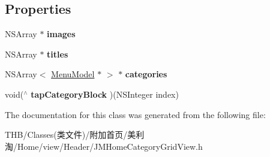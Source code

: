 \subsection*{Properties}
\begin{DoxyCompactItemize}
\item 
\mbox{\label{interface_j_m_home_category_grid_view_a5ecf24f65ebcf2ba1057268ddfbae11c}} 
N\+S\+Array $\ast$ {\bfseries images}
\item 
\mbox{\label{interface_j_m_home_category_grid_view_a6bbc90459957d23e0657859679050ca6}} 
N\+S\+Array $\ast$ {\bfseries titles}
\item 
\mbox{\label{interface_j_m_home_category_grid_view_a41e066e08791bbb966d182304d132a5b}} 
N\+S\+Array$<$ \mbox{\hyperlink{interface_menu_model}{Menu\+Model}} $\ast$ $>$ $\ast$ {\bfseries categories}
\item 
\mbox{\label{interface_j_m_home_category_grid_view_a3602e50e86feb8fd935eb0bd6676813a}} 
void($^\wedge$ {\bfseries tap\+Category\+Block} )(N\+S\+Integer index)
\end{DoxyCompactItemize}


The documentation for this class was generated from the following file\+:\begin{DoxyCompactItemize}
\item 
T\+H\+B/\+Classes(类文件)/附加首页/美利淘/\+Home/view/\+Header/J\+M\+Home\+Category\+Grid\+View.\+h\end{DoxyCompactItemize}

